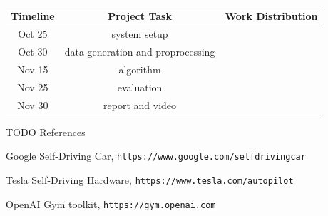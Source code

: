 \documentclass[a4paper]{article}
\begin{document}
\begin{center}
    \begin{tabular}{ | c | c | c | } 
        \hline
        Timeline & Project Task & Work Distribution   \\ 
        \hline
        Oct 25   & system setup &   \\ 
        \hline
        Oct 30   & data generation and proprocessing &   \\ 
        \hline
        Nov 15   & algorithm  &   \\ 
        \hline
        Nov 25   & evaluation  &   \\ 
        \hline
        Nov 30   & report and video  &   \\ 
        \hline
    \end{tabular}
\end{center}


TODO References\\


\begin{thebibliography}{9}
  Google Self-Driving Car, \texttt{https://www.google.com/selfdrivingcar}

  Tesla Self-Driving Hardware, \texttt{https://www.tesla.com/autopilot}

  OpenAI Gym toolkit, \texttt{https://gym.openai.com}

\end{thebibliography}
\end{document}
